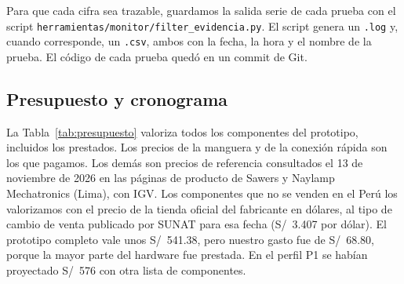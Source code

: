 Para que cada cifra sea trazable, guardamos la salida serie de cada prueba con el script \texttt{herramientas/monitor/filter\_evidencia.py}. El script genera un \texttt{.log} y, cuando corresponde, un \texttt{.csv}, ambos con la fecha, la hora y el nombre de la prueba. El código de cada prueba quedó en un commit de Git.

\subsection{Presupuesto y cronograma}
\label{sec:presupuesto}

La Tabla~\ref{tab:presupuesto} valoriza todos los componentes del prototipo, incluidos los prestados. Los precios de la manguera y de la conexión rápida son los que pagamos. Los demás son precios de referencia consultados el 13 de noviembre de 2026 en las páginas de producto de Sawers y Naylamp Mechatronics (Lima), con IGV. Los componentes que no se venden en el Perú los valorizamos con el precio de la tienda oficial del fabricante en dólares, al tipo de cambio de venta publicado por SUNAT para esa fecha (S/~3.407 por dólar). El prototipo completo vale unos S/~541.38, pero nuestro gasto fue de S/~68.80, porque la mayor parte del hardware fue prestada. En el perfil P1 se habían proyectado S/~576 con otra lista de componentes.

